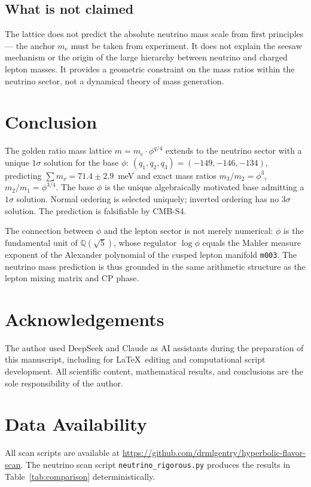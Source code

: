 \documentclass[12pt]{article}
\theoremstyle{definition}
\begin{document}
\subsection{What is not claimed}

The lattice does not predict the absolute neutrino mass scale
from first principles — the anchor $m_e$ must be taken from
experiment. It does not explain the seesaw mechanism or the origin
of the large hierarchy between neutrino and charged lepton masses.
It provides a geometric constraint on the mass ratios within the
neutrino sector, not a dynamical theory of mass generation.

\section{Conclusion}
\label{sec:conclusion}

The golden ratio mass lattice $m = m_e \cdot \phi^{q/4}$ extends
to the neutrino sector with a unique $1\sigma$ solution for the base
$\phi$: $(q_1, q_2, q_3) = (-149, -146, -134)$, predicting
$\sum m_\nu = 71.4 \pm 2.9$~meV and exact mass ratios
$m_3/m_2 = \phi^3$, $m_2/m_1 = \phi^{3/4}$. The base $\phi$ is the
unique algebraically motivated base admitting a $1\sigma$ solution.
Normal ordering is selected uniquely; inverted ordering has no
$3\sigma$ solution. The prediction is falsifiable by CMB-S4.

The connection between $\phi$ and the lepton sector is not merely
numerical: $\phi$ is the fundamental unit of $\mathbb{Q}(\sqrt{5})$,
whose regulator $\log\phi$ equals the Mahler measure exponent of
the Alexander polynomial of the cusped lepton manifold \texttt{m003}.
The neutrino mass prediction is thus grounded in the same arithmetic
structure as the lepton mixing matrix and CP phase.


\section*{Acknowledgements}
The author used DeepSeek and Claude as AI assistants during the
preparation of this manuscript, including for \LaTeX\ editing and
computational script development. All scientific content,
mathematical results, and conclusions are the sole responsibility
of the author.


\section*{Data Availability}
All scan scripts are available at
\url{https://github.com/drmlgentry/hyperbolic-flavor-scan}.
The neutrino scan script \texttt{neutrino\_rigorous.py} produces
the results in Table~\ref{tab:comparison} deterministically.
\end{document}
